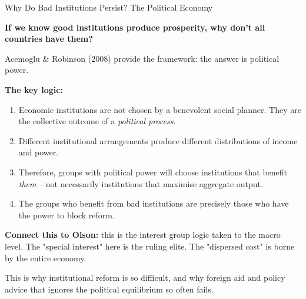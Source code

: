 \documentclass[10pt]{beamer}
\begin{document}
\begin{frame}[allowframebreaks]{Why Do Bad Institutions Persist? The Political Economy}

\textbf{If we know good institutions produce prosperity, why don't all countries have them?}


Acemoglu \& Robinson (2008) provide the framework: the answer is \alert{political power}.


\textbf{The key logic:}

\begin{enumerate}
\item Economic institutions are not chosen by a benevolent social planner. They are the collective outcome of a \emph{political process}.
\item Different institutional arrangements produce different distributions of income and power.
\item Therefore, groups with political power will choose institutions that benefit \emph{them} -- not necessarily institutions that maximise aggregate output.
\item The groups who benefit from bad institutions are precisely those who have the power to block reform.
\end{enumerate}


\textbf{Connect this to Olson:} this is the interest group logic taken to the macro level. The "special interest" here is the ruling elite. The "dispersed cost" is borne by the entire economy.


\alert{This is why institutional reform is so difficult, and why foreign aid and policy advice that ignores the political equilibrium so often fails.}
\end{frame}
\end{document}
